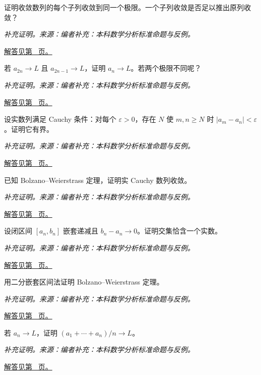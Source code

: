 \documentclass[12pt,fontset=fandol]{ctexart}
\begin{document}
\begin{example}[收敛子列与原列]\label{ex:c2q7}
证明收敛数列的每个子列收敛到同一个极限。一个子列收敛是否足以推出原列收敛？
\par\textit{补充证明。来源：编者补充：本科数学分析标准命题与反例。}\par\hyperref[ans:c2q7]{解答见第~\pageref{ans:c2q7} 页。}
\end{example}
\begin{example}[奇偶子列判别]\label{ex:c2q8}
若 $a_{2n}\to L$ 且 $a_{2n-1}\to L$，证明 $a_n\to L$。若两个极限不同呢？
\par\textit{补充证明。来源：编者补充：本科数学分析标准命题与反例。}\par\hyperref[ans:c2q8]{解答见第~\pageref{ans:c2q8} 页。}
\end{example}
\begin{example}\label{ex:c2q9}
设实数列满足 Cauchy 条件：对每个 $\varepsilon>0$，存在 $N$ 使 $m,n\ge N$ 时 $|a_m-a_n|<\varepsilon$。证明它有界。
\par\textit{补充证明。来源：编者补充：本科数学分析标准命题与反例。}\par\hyperref[ans:c2q9]{解答见第~\pageref{ans:c2q9} 页。}
\end{example}
\begin{example}\label{ex:c2q10}
已知 Bolzano--Weierstrass 定理，证明实 Cauchy 数列收敛。
\par\textit{补充证明。来源：编者补充：本科数学分析标准命题与反例。}\par\hyperref[ans:c2q10]{解答见第~\pageref{ans:c2q10} 页。}
\end{example}
\begin{example}[嵌套区间定理]\label{ex:c2q11}
设闭区间 $[a_n,b_n]$ 嵌套递减且 $b_n-a_n\to0$。证明交集恰含一个实数。
\par\textit{补充证明。来源：编者补充：本科数学分析标准命题与反例。}\par\hyperref[ans:c2q11]{解答见第~\pageref{ans:c2q11} 页。}
\end{example}
\begin{example}[有界数列必有收敛子列]\label{ex:c2q12}
用二分嵌套区间法证明 Bolzano--Weierstrass 定理。
\par\textit{补充证明。来源：编者补充：本科数学分析标准命题与反例。}\par\hyperref[ans:c2q12]{解答见第~\pageref{ans:c2q12} 页。}
\end{example}
\begin{example}\label{ex:c2q13}
若 $a_n\to L$，证明 $(a_1+\cdots+a_n)/n\to L$。
\par\textit{补充证明。来源：编者补充：本科数学分析标准命题与反例。}\par\hyperref[ans:c2q13]{解答见第~\pageref{ans:c2q13} 页。}
\end{example}
\end{document}
